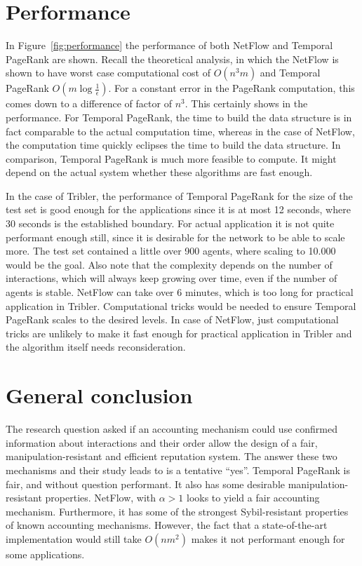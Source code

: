 \documentclass[a4paper,11pt]{book}
\newcommand{\eps}{\epsilon}
\theoremstyle{definition}
\begin{document}
\section{Performance}

In Figure~\ref{fig:performance} the performance of both NetFlow and Temporal PageRank are
shown. Recall the theoretical analysis, in which the NetFlow is shown to have
worst case computational cost of $O(n^3m)$ and Temporal PageRank $O(m\log\frac1\eps)$. For
a constant error in the PageRank computation, this comes down to a difference of factor of $n^3$.
This certainly shows in the performance. For Temporal PageRank, the time to build the data structure
is in fact comparable to the actual computation time, whereas in the case of NetFlow, the computation
time quickly eclipses the time to build the data structure. In comparison, Temporal PageRank is much 
more feasible to compute. It might depend on the actual system whether these algorithms are fast enough.

In the case of Tribler, the performance of Temporal PageRank for the size of the test set is good enough
for the applications since it is at most 12 seconds, where 30 seconds is the established boundary. 
For actual application it is not quite performant enough still, 
since it is desirable for the network to be able to scale more. The test set contained
a little over 900 agents, where scaling to 10.000 would be the goal. Also note that the
complexity depends on the number of interactions, which will always keep growing over
time, even if the number of agents is stable.
NetFlow can take over 6 minutes, which is too long for practical application in Tribler.
Computational tricks would be needed to ensure Temporal PageRank scales to the desired
levels. In case of NetFlow, just computational tricks are unlikely to make it fast enough
for practical application in Tribler and the algorithm itself needs reconsideration.

\section{General conclusion}

The research question asked if an accounting mechanism could use confirmed information about
interactions and their order allow the design of a fair, manipulation-resistant and efficient
reputation system. The answer these two mechanisms and their study leads to is a tentative
``yes''. Temporal PageRank is fair, and without question performant. It also
has some desirable manipulation-resistant properties. NetFlow, with $\alpha>1$ looks to
yield a fair accounting mechanism. Furthermore, it has some of the strongest Sybil-resistant
properties of known accounting mechanisms. However, the fact that a state-of-the-art implementation
would still take $O(nm^2)$ makes it not performant enough for some applications.
\end{document}
